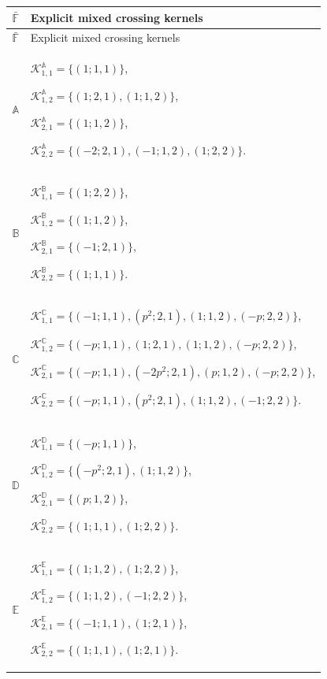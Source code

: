 \documentclass{amsart}
\theoremstyle{definition}
\theoremstyle{remark}
\numberwithin{equation}{section}
\begin{document}
\begin{center}
\renewcommand{\arraystretch}{1.35}
\begin{longtable}{c|p{}}
\toprule
$\bar{\mathbb{F}}$ & Explicit mixed crossing kernels\\
\midrule
\endfirsthead

\toprule
$\bar{\mathbb{F}}$ & Explicit mixed crossing kernels\\
\midrule
\endhead

$\mathbb{A}$ &
$\mathscr{K}_{1,1}^{\mathbb{A}}=\{(1;1,1)\}$,

$\mathscr{K}_{1,2}^{\mathbb{A}}=\{(1;2,1),(1;1,2)\}$,

$\mathscr{K}_{2,1}^{\mathbb{A}}=\{(1;1,2)\}$,

$\mathscr{K}_{2,2}^{\mathbb{A}}=\{(-2;2,1),(-1;1,2),(1;2,2)\}$.
\\

$\mathbb{B}$ &
$\mathscr{K}_{1,1}^{\mathbb{B}}=\{(1;2,2)\}$,

$\mathscr{K}_{1,2}^{\mathbb{B}}=\{(1;1,2)\}$,

$\mathscr{K}_{2,1}^{\mathbb{B}}=\{(-1;2,1)\}$,

$\mathscr{K}_{2,2}^{\mathbb{B}}=\{(1;1,1)\}$.
\\

$\mathbb{C}$ &
$\mathscr{K}_{1,1}^{\mathbb{C}}=\{(-1;1,1),(p^2;2,1),(1;1,2),(-p;2,2)\}$,

$\mathscr{K}_{1,2}^{\mathbb{C}}=\{(-p;1,1),(1;2,1),(1;1,2),(-p;2,2)\}$,

$\mathscr{K}_{2,1}^{\mathbb{C}}=\{(-p;1,1),(-2p^2;2,1),(p;1,2),(-p;2,2)\}$,

$\mathscr{K}_{2,2}^{\mathbb{C}}=\{(-p;1,1),(p^2;2,1),(1;1,2),(-1;2,2)\}$.
\\

$\mathbb{D}$ &
$\mathscr{K}_{1,1}^{\mathbb{D}}=\{(-p;1,1)\}$,

$\mathscr{K}_{1,2}^{\mathbb{D}}=\{(-p^2;2,1),(1;1,2)\}$,

$\mathscr{K}_{2,1}^{\mathbb{D}}=\{(p;1,2)\}$,

$\mathscr{K}_{2,2}^{\mathbb{D}}=\{(1;1,1),(1;2,2)\}$.
\\

$\mathbb{E}$ &
$\mathscr{K}_{1,1}^{\mathbb{E}}=\{(1;1,2),(1;2,2)\}$,

$\mathscr{K}_{1,2}^{\mathbb{E}}=\{(1;1,2),(-1;2,2)\}$,

$\mathscr{K}_{2,1}^{\mathbb{E}}=\{(-1;1,1),(1;2,1)\}$,

$\mathscr{K}_{2,2}^{\mathbb{E}}=\{(1;1,1),(1;2,1)\}$.
\\


\end{longtable}
\end{center}
\end{document}
